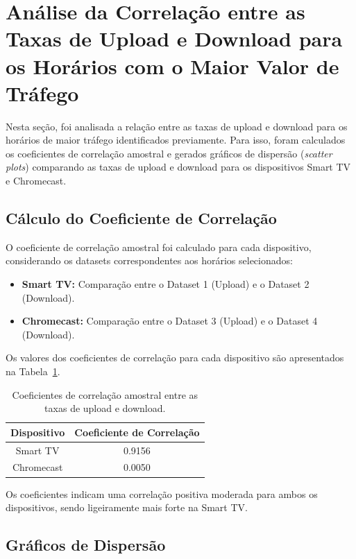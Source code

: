\section{Análise da Correlação entre as Taxas de Upload e Download para os Horários com o Maior Valor de Tráfego}

Nesta seção, foi analisada a relação entre as taxas de upload e download para os horários de maior tráfego identificados previamente. Para isso, foram calculados os coeficientes de correlação amostral e gerados gráficos de dispersão (\textit{scatter plots}) comparando as taxas de upload e download para os dispositivos Smart TV e Chromecast.

\subsection{Cálculo do Coeficiente de Correlação}

O coeficiente de correlação amostral foi calculado para cada dispositivo, considerando os datasets correspondentes aos horários selecionados:
\begin{itemize}
    \item \textbf{Smart TV:} Comparação entre o Dataset 1 (Upload) e o Dataset 2 (Download).
    \item \textbf{Chromecast:} Comparação entre o Dataset 3 (Upload) e o Dataset 4 (Download).
\end{itemize}

Os valores dos coeficientes de correlação para cada dispositivo são apresentados na Tabela~\ref{tab:coeficientes_correlacao}.

\begin{table}[H]
    \centering
    \caption{Coeficientes de correlação amostral entre as taxas de upload e download.}
    \label{tab:coeficientes_correlacao}
    \begin{tabular}{|c|c|}
        \hline
        \textbf{Dispositivo} & \textbf{Coeficiente de Correlação} \\ \hline
        Smart TV & 0.9156 \\ \hline
        Chromecast & 0.0050 \\ \hline
    \end{tabular}
\end{table}

Os coeficientes indicam uma correlação positiva moderada para ambos os dispositivos, sendo ligeiramente mais forte na Smart TV.

\subsection{Gráficos de Dispersão}

